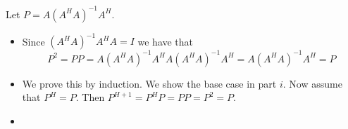 \documentclass[12pt]{article}
\newenvironment{problem}[2][Problem]{\begin{trivlist}
\item[\hskip \labelsep {\bfseries #1}\hskip \labelsep {\bfseries #2}]}{\end{trivlist}}
\begin{document}
\begin{problem}{37.} 
\end{problem}

\begin{problem}{47.} Let $P = A(A^HA)^{-1}A^H$.
\begin{itemize}
\item [(i)]  Since $(A^HA)^{-1}A^HA= I$ we have that $$P^2 =PP= A(A^HA)^{-1}A^HA(A^HA)^{-1}A^H = A(A^HA)^{-1}A^H = P$$
\item [(ii)] We prove this by induction. We show the base case in part $i$. Now assume that $P^H = P$. Then $P^{H+1} = P^HP = PP = P^2 = P$. 
\item [(iii)]
\end{itemize} 
\end{problem}
\end{document}
